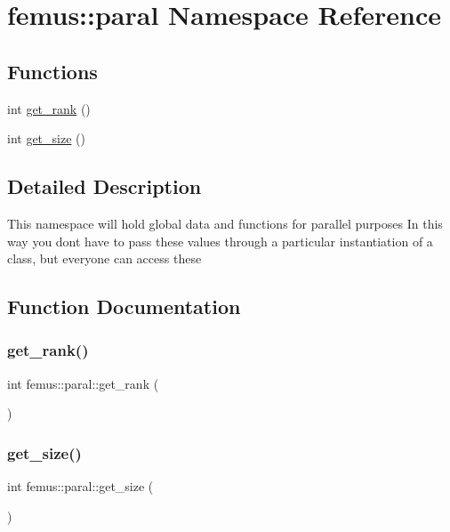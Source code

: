 \hypertarget{namespacefemus_1_1paral}{}\section{femus\+:\+:paral Namespace Reference}
\label{namespacefemus_1_1paral}
\subsection*{Functions}
\begin{DoxyCompactItemize}
\item 
int \mbox{\hyperlink{namespacefemus_1_1paral_aaa59cb24784a64914811ba1045135a05}{get\+\_\+rank}} ()
\item 
int \mbox{\hyperlink{namespacefemus_1_1paral_ab52c566b553c37a8345998ec5e384028}{get\+\_\+size}} ()
\end{DoxyCompactItemize}


\subsection{Detailed Description}
This namespace will hold global data and functions for parallel purposes In this way you dont have to pass these values through a particular instantiation of a class, but everyone can access these 

\subsection{Function Documentation}
\mbox{\label{namespacefemus_1_1paral_aaa59cb24784a64914811ba1045135a05}} 
\subsubsection{\texorpdfstring{get\+\_\+rank()}{get\_rank()}}
{\footnotesize\ttfamily int femus\+::paral\+::get\+\_\+rank (\begin{DoxyParamCaption}{ }\end{DoxyParamCaption})\hspace{0.3cm}{\ttfamily [inline]}}

\mbox{\label{namespacefemus_1_1paral_ab52c566b553c37a8345998ec5e384028}} 
\subsubsection{\texorpdfstring{get\+\_\+size()}{get\_size()}}
{\footnotesize\ttfamily int femus\+::paral\+::get\+\_\+size (\begin{DoxyParamCaption}{ }\end{DoxyParamCaption})\hspace{0.3cm}{\ttfamily [inline]}}

